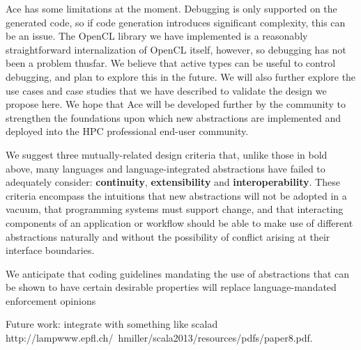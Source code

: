 \documentclass[9pt,preprint]{sigplanconf}
\begin{document}
Ace has some limitations at the moment. Debugging is only supported on the generated code, so if code generation introduces significant complexity, this can be an issue. The OpenCL library we have implemented is a reasonably straightforward internalization of OpenCL itself, however, so debugging has not been a problem thusfar. We believe that active types can be useful to control debugging, and plan to explore this in the future. We will also further explore the use cases and case studies that we have described to validate the design we propose here. We hope that Ace will be developed further by the community to strengthen the foundations upon which new abstractions are implemented and deployed into the HPC professional end-user community.

We suggest three mutually-related {design criteria} that, unlike those in bold above, many languages and language-integrated abstractions have failed to adequately consider: \textbf{continuity}, \textbf{extensibility} and \textbf{interoperability}. These criteria encompass the intuitions that new abstractions will not be adopted in a vacuum, that programming systems must  support change, and that interacting components of an application or workflow should be able to make use of different abstractions naturally and without the possibility of conflict arising at their interface boundaries.


 We anticipate that coding guidelines mandating the use of abstractions that can be shown to have certain desirable properties will replace language-mandated enforcement opinions 
 
 Future work: integrate with something like scalad http://lampwww.epfl.ch/~hmiller/scala2013/resources/pdfs/paper8.pdf.







\end{document}
